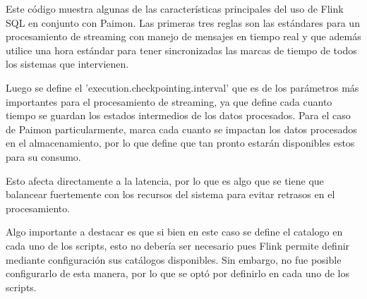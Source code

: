 Este código muestra algunas de las características principales del uso de Flink SQL en conjunto con Paimon.
Las primeras tres reglas son las estándares para un procesamiento de streaming 
con manejo de mensajes en tiempo real y que además utilice una hora estándar para tener sincronizadas
las marcas de tiempo de todos los sistemas que intervienen.

Luego se define el 'execution.checkpointing.interval' que es de los parámetros más importantes para el procesamiento de streaming,
ya que define cada cuanto tiempo se guardan los estados intermedios de los datos procesados.
Para el caso de Paimon particularmente, marca cada cuanto se impactan los datos procesados en el almacenamiento,
por lo que define que tan pronto estarán disponibles estos para su consumo.

Esto afecta directamente a la latencia, por lo que es algo que se tiene que balancear fuertemente con 
los recursos del sistema para evitar retrasos en el procesamiento.

Algo importante a destacar es que si bien en este caso se define el catalogo en cada uno de los scripts, 
esto no debería ser necesario pues Flink permite definir mediante configuración sus catálogos disponibles.
Sin embargo, no fue posible configurarlo de esta manera, por lo que se optó por definirlo en cada uno de los scripts.